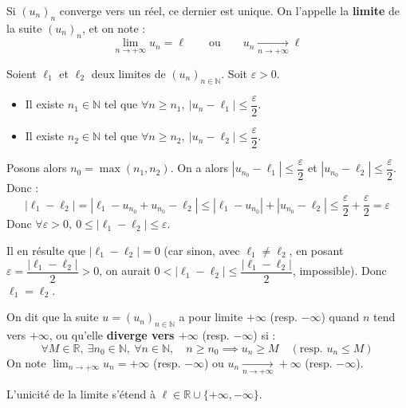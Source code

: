 \documentclass[a4paper,11pt]{article}
\newcommand{\R}{\mathbb{R}}
\newcommand{\N}{\mathbb{N}}
\newcommand{\mot}[1]{\textcolor{bordeaux}{\textbf{#1}}}
\begin{document}
\begin{proposition}
Si $(u_n)_n$ converge vers un réel, ce dernier est unique. On l'appelle la \mot{limite} de la suite $(u_n)_n$, et on note :
\[
\lim_{n \to +\infty} u_n = \ell \qquad \text{ou} \qquad u_n \xrightarrow[n \to +\infty]{} \ell
\]
\end{proposition}

\begin{demonstration}
Soient $\ell_1$ et $\ell_2$ deux limites de $(u_n)_{n \in \N}$. Soit $\varepsilon > 0$.
\begin{itemize}
    \item Il existe $n_1 \in \N$ tel que $\forall n \ge n_1, \ |u_n - \ell_1| \le \dfrac{\varepsilon}{2}$.
    \item Il existe $n_2 \in \N$ tel que $\forall n \ge n_2, \ |u_n - \ell_2| \le \dfrac{\varepsilon}{2}$.
\end{itemize}
Posons alors $n_0 = \max(n_1, n_2)$. On a alors $|u_{n_0} - \ell_1| \le \dfrac{\varepsilon}{2}$ et $|u_{n_0} - \ell_2| \le \dfrac{\varepsilon}{2}$. Donc :
\[
|\ell_1 - \ell_2| = |\ell_1 - u_{n_0} + u_{n_0} - \ell_2| \le |\ell_1 - u_{n_0}| + |u_{n_0} - \ell_2| \le \frac{\varepsilon}{2} + \frac{\varepsilon}{2} = \varepsilon
\]
Donc $\forall \varepsilon > 0, \ 0 \le |\ell_1 - \ell_2| \le \varepsilon$.

Il en résulte que $|\ell_1 - \ell_2| = 0$ (car sinon, avec $\ell_1 \neq \ell_2$, en posant $\varepsilon = \dfrac{|\ell_1 - \ell_2|}{2} > 0$, on aurait $0 < |\ell_1 - \ell_2| \le \dfrac{|\ell_1 - \ell_2|}{2}$, impossible). Donc $\ell_1 = \ell_2$.
\end{demonstration}

\begin{definition}
On dit que la suite $u = (u_n)_{n \in \N}$ a pour limite $+\infty$ (resp. $-\infty$) quand $n$ tend vers $+\infty$, ou qu'elle \mot{diverge vers $+\infty$} (resp. $-\infty$) si :
\[
\forall M \in \R, \ \exists n_0 \in \N, \ \forall n \in \N, \quad n \ge n_0 \implies u_n \ge M \quad (\text{resp. } u_n \le M)
\]
On note $\displaystyle\lim_{n \to +\infty} u_n = +\infty$ (resp. $-\infty$) ou $u_n \xrightarrow[n \to +\infty]{} +\infty$ (resp. $-\infty$).
\end{definition}

\begin{remarque}
L'unicité de la limite s'étend à $\ell \in \R \cup \{+\infty, -\infty\}$.
\end{remarque}
\end{document}
